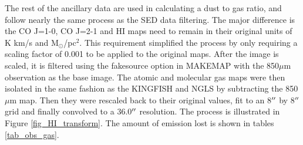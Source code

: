 The rest of the ancillary data are used in calculating a dust to gas ratio, and follow nearly the same process as the SED data filtering.  The major difference is the CO J=1-0, CO J=2-1 and HI maps need to remain in their original units of K km/s and M$_\odot$/pc$^2$.  This requirement simplified the process by only requiring a scaling factor of 0.001 to be applied to the original maps.  After the image is scaled, it is filtered using the fakesource option in MAKEMAP with the 850$\mu$m observation as the base image.  The atomic and molecular gas maps were then isolated in the same fashion as the KINGFISH and NGLS by subtracting the 850$\mu$m map.  Then they were rescaled back to their original values, fit to an 8$\mbox{$^{\prime\prime}$}$ by 8$\mbox{$^{\prime\prime}$}$ grid and finally convolved to a 36.0$\mbox{$^{\prime\prime}$}$ resolution.  The process is illustrated in Figure \ref{fig_HI_transform}.  The amount of emission lost is shown in tables \ref{tab_obs_gas}.


